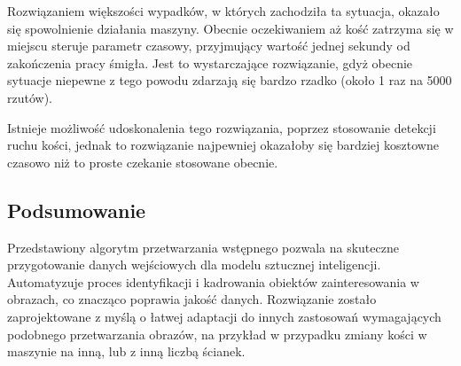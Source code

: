 Rozwiązaniem większości wypadków, w których zachodziła ta sytuacja, okazało się spowolnienie działania maszyny.
Obecnie oczekiwaniem aż kość zatrzyma się w miejscu steruje parametr czasowy, przyjmujący wartość jednej sekundy od zakończenia pracy śmigła.
Jest to wystarczające rozwiązanie, gdyż obecnie sytuacje niepewne z tego powodu zdarzają się bardzo rzadko (około 1 raz na 5000 rzutów).

Istnieje możliwość udoskonalenia tego rozwiązania, poprzez stosowanie detekcji ruchu kości,
jednak to rozwiązanie najpewniej okazałoby się bardziej kosztowne czasowo niż to proste czekanie stosowane obecnie.


\subsection{Podsumowanie}\label{subsec:podsumowanie}

Przedstawiony algorytm przetwarzania wstępnego pozwala na skuteczne przygotowanie danych wejściowych dla modelu sztucznej inteligencji.
Automatyzuje proces identyfikacji i kadrowania obiektów zainteresowania w obrazach, co znacząco poprawia jakość danych.
Rozwiązanie zostało zaprojektowane z myślą o łatwej adaptacji do innych zastosowań wymagających podobnego przetwarzania obrazów,
na przykład w przypadku zmiany kości w maszynie na inną, lub z inną liczbą ścianek.

